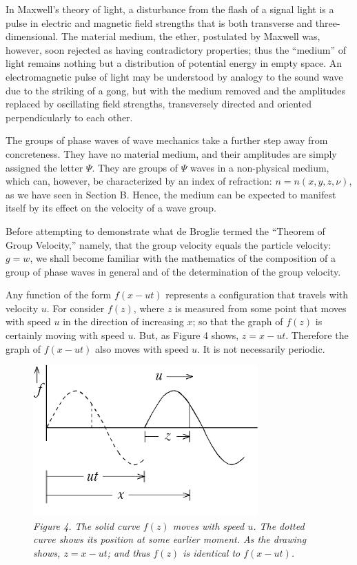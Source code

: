 In Maxwell's theory of light, a disturbance from the flash of a signal
light is a pulse in electric and magnetic field strengths that is both
transverse and three-dimensional. The material medium, the ether,
postulated by Maxwell was, however, soon rejected as having
contradictory properties; thus the ``medium'' of light remains nothing
but a distribution of potential energy in empty space. An
electromagnetic pulse of light may be understood by analogy to the sound
wave due to the striking of a gong, but with the medium removed and the
amplitudes replaced by oscillating field strengths, transversely
directed and oriented perpendicularly to each other.

The groups of phase waves of wave mechanics take a further step away
from concreteness. They have no material medium, and their amplitudes
are simply assigned the letter $\Psi$. They are groups of $\Psi$
waves in a non-physical medium, which can, however, be characterized by
an index of refraction: $n = n(x,y,z,\nu)$, as we have seen in
Section B. Hence, the medium can be expected to manifest itself by its
effect on the velocity of a wave group.

Before attempting to demonstrate what de Broglie termed the ``Theorem of
Group Velocity,'' namely, that the group velocity equals the particle
velocity: $g = w$, we shall become familiar with the
mathematics of the composition of a group of phase waves in general and
of the determination of the group velocity.

Any function of the form $f(x-ut)$ represents a
configuration that travels with velocity $u$. For consider
$f(z)$, where $z$ is measured from some point that
moves with speed $u$ in the direction of increasing $x$; so
that the graph of $f(z)$ is certainly moving with speed
$u$. But, as Figure 4 shows, $z = x-ut$.
Therefore the graph of $f(x-ut)$ also moves with
speed $u$. It is not necessarily periodic.

\begin{figure}[h] %
  \begin{center}
    \captionsetup{width=3.4in}
    \includegraphics[width=3.4in,height=2.28in]{images/08_debroglie/image025.png}
    \caption*{\emph{Figure 4. The solid curve $f(z)$ moves with speed $u$.
    The dotted curve shows its position at some earlier moment. As the
    drawing shows, $z = x - ut$; and thus
    $f(z)$ is identical to $f(x-ut)$.}}
  \end{center}
\end{figure}

